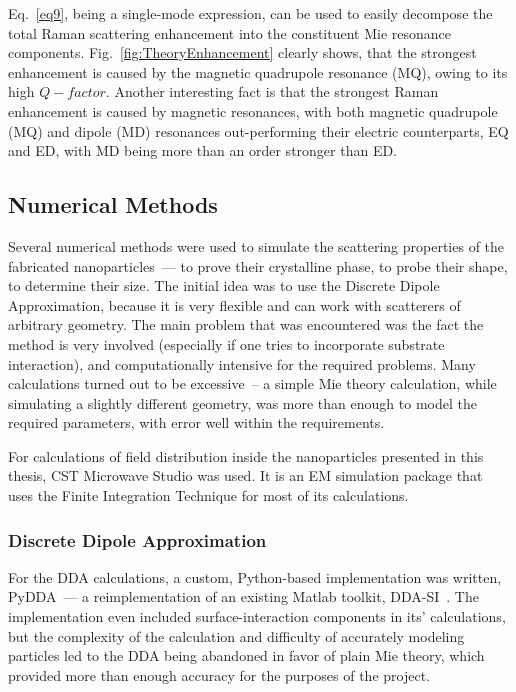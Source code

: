         Eq.~\ref{eq9}, being a single-mode expression, can be used to easily decompose the total Raman scattering enhancement into the constituent
        Mie resonance components. Fig.~\ref{fig:TheoryEnhancement} clearly shows, that the strongest enhancement is caused by the magnetic quadrupole
        resonance (MQ), owing to its high $Q-factor$. Another interesting fact is that the strongest Raman enhancement is caused by magnetic resonances,
        with both magnetic quadrupole (MQ) and dipole (MD) resonances out-performing their electric counterparts, EQ and ED, with MD being more than an
        order stronger than ED.

    \subsection{Numerical Methods}
    \label{sec:Numeric}
        Several numerical methods were used to simulate the scattering properties of the fabricated nanoparticles~--- to prove their
        crystalline phase, to probe their shape, to determine their size. The initial idea was to use the Discrete Dipole Approximation,
        because it is very flexible and can work with scatterers of arbitrary geometry. The main problem that was encountered was the fact
        the method is very involved (especially if one tries to incorporate substrate interaction), and computationally intensive for
        the required problems. Many calculations turned out to be excessive~-- a simple Mie theory calculation,
        while simulating a slightly different geometry, was more than enough to model the required parameters, with error well within the
        requirements.

        For calculations of field distribution inside the nanoparticles presented in this thesis, CST Microwave Studio was used.
        It is an  EM simulation package that uses the Finite Integration Technique for most of its calculations.

        \clearpage
        \subsubsection{Discrete Dipole Approximation}
        \label{subsec:DDA}

                For the DDA calculations, a custom, Python-based implementation was written, PyDDA~--- a reimplementation of an existing
            Matlab toolkit, DDA-SI~\cite{loke2011discrete}. The implementation even included surface-interaction components in its' calculations,
            but the complexity of the calculation and difficulty of accurately modeling particles led to the DDA being abandoned in favor of plain
            Mie theory, which provided more than enough accuracy for the purposes of the project.

